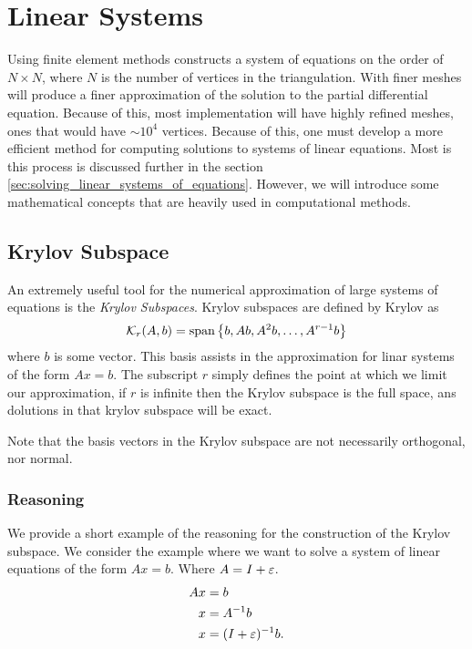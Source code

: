 \documentclass[../fem.tex]{subfile}
\begin{document}
\section{Linear Systems}%
\label{sec:linear_systems}

Using finite element methods constructs a system of equations on the order of
$N\times N$, where $N$ is the number of vertices in the triangulation. With
finer meshes will produce a finer approximation of the solution to the partial
differential equation. Because of this, most implementation will have highly
refined meshes, ones that would have $\sim 10^4$ vertices. Because of this, one
must develop a more efficient method for computing solutions to systems of
linear equations. Most is this process is discussed further in the
section \ref{sec:solving_linear_systems_of_equations}. However, we will
introduce some mathematical
concepts that are heavily used in computational methods.

\subsection{Krylov Subspace}%
\label{sub:krylov_subspace}

An extremely useful tool for the numerical approximation of large systems of
equations is the \textit{Krylov Subspaces}. Krylov subspaces are defined by
Krylov \cite{KRYLOV} as
\begin{align*}
  \mathcal{K}_r(A,b)=\text{span}\left\{b,Ab,A^2b,\ldots,A^{r-1}b\right\}
\end{align*}
where $b$ is some vector. This basis assists in the approximation for linar
systems of the form $Ax=b$. The subscript $r$ simply defines the point at which
we limit our approximation, if $r$ is infinite then the Krylov subspace is the
full space, ans dolutions in that krylov subspace will be exact.

Note that the basis vectors in the Krylov subspace are not necessarily
orthogonal, nor normal.

\subsubsection{Reasoning}%
\label{ssub:reasoning}

We provide a short example of the reasoning for the construction of the Krylov
subspace. We consider the example where we want to solve a system of linear
equations of the form $Ax=b$. Where $A=I+{\varepsilon}$.
\begin{align*}
  Ax&=b\\
  x&=A^{-1}b\\
  x&=(I+{\varepsilon})^{-1}b.
\end{align*}
\end{document}
